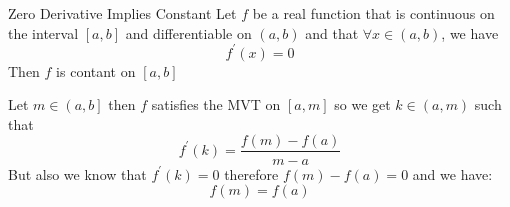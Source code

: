 \documentclass[preview]{standalone}
\begin{document}
\begin{theo*}{Zero Derivative Implies Constant}
  Let $f$ be a real function that is continuous on the interval $ \left[ a, b \right]$ and differentiable on $ \left(  a, b \right)$ and that $\forall x \in \left( a , b \right)$, we have 
  \[
  f ^{\prime}\left(x\right) = 0
  \]
  Then $f$ is contant on $ \left[ a, b\right]$ 
  \begin{pf}
    Let $m \in \left( a, b \right]$ then $f$ satisfies the MVT on $ \left[ a, m \right]$ so we get $k \in \left( a, m \right)$ such that 
    \[
    f ^{\prime}\left(k\right) = \frac{f\left(m\right)  -  f\left(a\right)}{m  -  a}
    \]
    But also we know that $f ^{\prime}\left(k\right) = 0$ therefore $f\left(m\right)  -  f\left(a\right) = 0$ and we have:
    \[
    f\left(m\right) = f\left(a\right)
    \]
  \end{pf}
\end{theo*}
\end{document}
